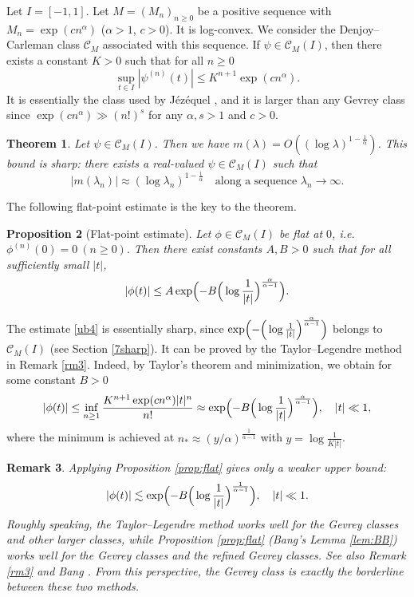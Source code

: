 \documentclass[11pt]{amsart}
\newtheorem{theorem}{Theorem}[section]
\newtheorem{proposition}[theorem]{Proposition}
\newtheorem{remark}[theorem]{Remark}
\newcommand{\la}{\lambda}
\newcommand{\ls}{\lesssim}
\newcommand{\1}{{\rm 1\hspace*{-0.4ex}%
			\rule{0.1ex}{1.52ex}\hspace*{0.2ex}}}
\numberwithin{equation}{section}
\begin{document}
Let $I=[-1,1]$. Let $M=(M_n)_{n\ge 0}$ be a positive sequence with $M_n=\exp(cn^\alpha)$ ($\alpha>1$, $c>0$). It is log-convex. We consider the Denjoy--Carleman class $\mathcal{C}_M$ associated with this sequence. If $\psi\in \mathcal{C}_M(I)$, then there exists a constant $K>0$ such that for all $n\ge 0$
\begin{equation}\label{defdc1}
	\sup_{t\in I}|\psi^{(n)}(t)|\le K^{n+1}\exp(cn^\alpha).
\end{equation}
It is essentially the class used by Jézéquel \cite{jez}, and it is larger than any Gevrey class since $\exp(cn^\alpha)\gg (n!)^s$ for any $\alpha,s>1$ and $c>0$.

\begin{theorem}\label{thm:main4}
		Let $\psi\in \mathcal{C}_M(I)$. Then we have $m(\la)=O((\log\la)^{1-\frac1\alpha})$. 
	This bound is sharp: there exists a real-valued $\psi\in \mathcal{C}_M(I)$ such that
	\[
	|m(\lambda_n)| \approx (\log\la_n)^{1-\frac1\alpha}
	\quad\text{along a sequence }\lambda_n\to\infty.
	\]
\end{theorem}
The following flat-point estimate is the key to the theorem.
\begin{proposition}[Flat-point estimate]\label{prop4}
Let $\phi\in \mathcal{C}_M(I)$ be flat at $0$, i.e. $\phi^{(n)}(0)=0\ (n\ge 0).$
	Then there exist constants $A,B>0$ such that for all sufficiently small $|t|$,
	\begin{equation}\label{ub4}
		|\phi(t)|\le A\exp\Bigl(-B \Big(\log\frac1{|t|}\Big)^{\frac\alpha{\alpha-1}}\Bigr).
	\end{equation}
\end{proposition}
The estimate \eqref{ub4} is essentially sharp, since $\exp\Bigl(- \Big(\log\frac1{|t|}\Big)^{\frac\alpha{\alpha-1}}\Bigr)$ belongs to $\mathcal{C}_M(I)$ (see Section \ref{7sharp}). It can be proved by the Taylor--Legendre method in Remark \ref{rm3}. Indeed, by Taylor's theorem and minimization, we obtain for some constant $B>0$
\[|\phi(t)|\le \inf_{n\ge1}\frac{K^{n+1}\exp(cn^\alpha)|t|^n}{n!}\approx \exp\Bigl(-B \Big(\log\frac1{|t|}\Big)^{\frac\alpha{\alpha-1}}\Bigr),\quad |t|\ll1,\]
where the minimum is achieved at $n_*\approx (y/\alpha)^{\frac1{\alpha-1}}$ with $y=\log\frac1{K|t|}$. 

\begin{remark}\label{rm4}{\rm Applying Proposition \ref{prop:flat} gives only a weaker upper bound:
	\[|\phi(t)|\ls \exp\Bigl(-B \Big(\log\frac1{|t|}\Big)^{\frac1{\alpha-1}}\Bigr),\quad |t|\ll1.\]
	Roughly speaking, the Taylor--Legendre method works well for the Gevrey classes and other larger classes, while Proposition \ref{prop:flat} (Bang's Lemma \ref{lem:BB}) works well for the Gevrey classes and the refined Gevrey classes. See also Remark \ref{rm3} and Bang \cite[p.~143]{bang}. From this perspective, the Gevrey class is exactly the borderline between these two methods.}
\end{remark}
\end{document}
